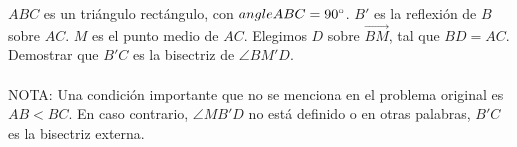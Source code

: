 $ABC$ es un triángulo rectángulo, con $\\angle ABC = 90^{\circ}$. $B'$ es la reflexión de $B$ sobre $AC$. $M$ es el punto medio de $AC$. Elegimos $D$ sobre $\overrightarrow{BM}$, tal que $BD = AC$. Demostrar que $B'C$ es la bisectriz de $\angle BM'D$. \\\\
NOTA: Una condición importante que no se menciona en el problema original es $AB<BC$. En caso contrario, $\angle MB'D$ no está definido o en otras palabras, $B'C$ es la bisectriz externa.
